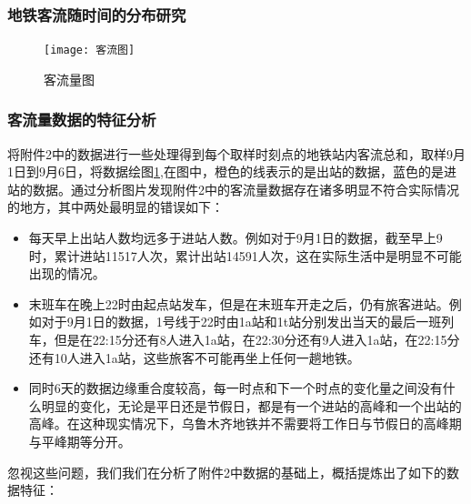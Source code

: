\documentclass[12pt,a4paper]{mcmthesis}
\begin{document}
\subsubsection{地铁客流随时间的分布研究}
\begin{figure}[h!t]
	\centerline{\texttt{[image: 客流图]}\quad
	}
	\caption{\song\wuhao
		客流量图}
	\label{fig:客流量}
\end{figure}

\subsubsection{客流量数据的特征分析}

将附件2中的数据进行一些处理得到每个取样时刻点的地铁站内客流总和，取样9月1日到9月6日，将数据绘图\ref{fig:客流量},在图中，橙色的线表示的是出站的数据，蓝色的是进站的数据。通过分析图片发现附件2中的客流量数据存在诸多明显不符合实际情况的地方，其中两处最明显的错误如下：

\begin{itemize}
	\item 每天早上出站人数均远多于进站人数。例如对于9月1日的数据，截至早上9时，累计进站11517人次，累计出站14591人次，这在实际生活中是明显不可能出现的情况。
	\item 末班车在晚上22时由起点站发车，但是在末班车开走之后，仍有旅客进站。例如对于9月1日的数据，1号线于22时由1a站和1t站分别发出当天的最后一班列车，但是在22:15分还有8人进入1a站，在22:30分还有9人进入1a站，在22:15分还有10人进入1a站，这些旅客不可能再坐上任何一趟地铁。
	\item 同时6天的数据边缘重合度较高，每一时点和下一个时点的变化量之间没有什么明显的变化，无论是平日还是节假日，都是有一个进站的高峰和一个出站的高峰。在这种现实情况下，乌鲁木齐地铁并不需要将工作日与节假日的高峰期与平峰期等分开。
\end{itemize}

忽视这些问题，我们我们在分析了附件2中数据的基础上，概括提炼出了如下的数据特征：
\end{document}
